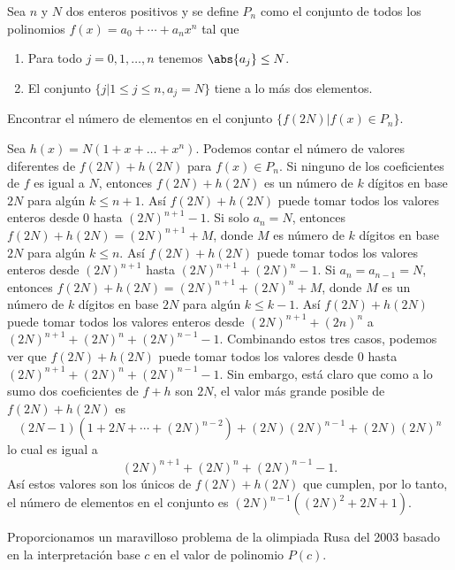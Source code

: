 \begin{example}
    Sea $n$ y $N$ dos enteros positivos y se define $P_n$ como el conjunto de todos los polinomios $f(x) = a_0 + \cdots + a_n x^n$ tal que
    \begin{enumerate}
        \item Para todo $j = 0, 1, \ldots, n$ tenemos $\abs{a_j} \leq N$.
        \item El conjunto $\{j | 1 \leq j \leq n, a_j = N\}$ tiene a lo más dos elementos.
    \end{enumerate}
    Encontrar el número de elementos en el conjunto $\{f(2N) | f(x) \in P_n \}$.
\end{example}
\begin{solution}
    Sea $h(x) = N (1 + x + \ldots + x^n)$.
    Podemos contar el número de valores diferentes de $f(2N) + h(2N)$ para $f(x) \in P_n$.
    Si ninguno de los coeficientes de $f$ es igual a $N$, entonces $f(2N) + h(2N)$ es un número de $k$ dígitos en base $2N$ para algún $k \leq n + 1$.
    Así $f(2N) + h(2N)$ puede tomar todos los valores enteros desde 0 hasta $(2N)^{n + 1} - 1$.
    Si solo $a_n = N$, entonces $f(2N) + h(2N) = (2N)^{n + 1} + M$, donde $M$ es número de $k$ dígitos en base $2N$ para algún $k \leq n$.
    Así $f(2N) + h(2N)$ puede tomar todos los valores enteros desde $(2N)^{n + 1}$ hasta $(2N)^{n + 1} + (2N)^n - 1$.
    Si $a_n = a_{n - 1} = N$, entonces $f(2N) + h(2N) = (2N)^{n + 1} + (2N)^n + M$, donde $M$ es un número de $k$ dígitos en base $2N$ para algún $k \leq k - 1$.
    Así $f(2N) + h(2N)$ puede tomar todos los valores enteros desde $(2N)^{n + 1} + (2n)^n$ a $(2N)^{n + 1} + (2N)^n + (2N)^{n - 1} - 1$.
    Combinando estos tres casos, podemos ver que $f(2N) + h(2N)$ puede tomar todos los valores desde 0 hasta $(2N)^{n + 1} + (2N)^n + (2N)^{n - 1} - 1$.
    Sin embargo, está claro que como a lo sumo dos coeficientes de $f + h$ son $2N$, el valor más grande posible de $f(2N) + h(2N)$ es
    \[
        (2N - 1)(1 + 2N + \cdots + (2N)^{n - 2}) + (2N)(2N)^{n - 1} + (2N)(2N)^n
    \]
    lo cual es igual a
    \[
        (2N)^{n + 1} + (2N)^n + (2N)^{n - 1} - 1.
    \]
    Así estos valores son los únicos de $f(2N) + h(2N)$ que cumplen, por lo tanto, el número de elementos en el conjunto es $(2N)^{n - 1} ( (2N)^2 + 2N + 1)$.
\end{solution}

Proporcionamos un maravilloso problema de la olimpiada Rusa del 2003 basado en la interpretación base $c$ en el valor de polinomio $P(c)$.

